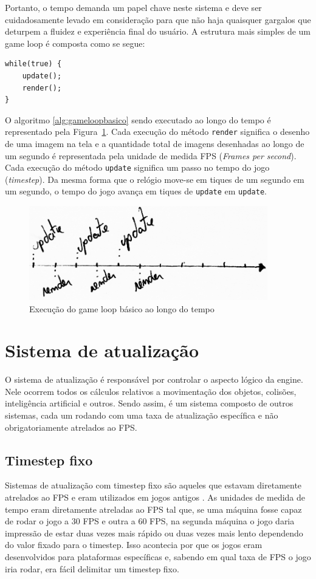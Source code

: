 \documentclass[12pt, 
openright, 
oneside, 
a4paper,    
brazil]{facom-ufu-abntex2}
\begin{document}
Portanto, o tempo demanda um papel chave neste sistema e deve ser cuidadosamente levado em consideração para que não haja quaisquer gargalos que deturpem a fluidez e experiência final do usuário. A estrutura mais simples de um game loop é composta como se segue:

\begin{lstlisting}[caption={Estrutura básica do Game Loop}, label={alg:gameloopbasico}]
while(true) {
	update();
	render();
}
\end{lstlisting}


O algoritmo \ref{alg:gameloopbasico} sendo executado ao longo do tempo é representado pela Figura~\ref{fig:gameloopbasico}.
Cada execução do método \texttt{render} significa o desenho de uma imagem na tela e a quantidade total de imagens desenhadas ao longo de um segundo é representada pela unidade de medida FPS (\textit{Frames per second}). Cada execução do método \texttt{update} significa um passo no tempo do jogo (\textit{timestep}). Da mesma forma que o relógio move-se em tiques de um segundo em um segundo, o tempo do jogo avança em tiques de \texttt{update} em \texttt{update}.

\begin{figure}[H]
	\centering
	\includegraphics[width=28em]{imagens/ilu1_small.png}
	\caption{Execução do game loop básico ao longo do tempo\label{fig:gameloopbasico}}
\end{figure}




\section{Sistema de atualização}
O sistema de atualização é responsável por controlar o aspecto lógico da engine. Nele ocorrem todos os cálculos relativos a movimentação dos objetos, colisões, inteligência artificial e outros. Sendo assim, é um sistema composto de outros sistemas, cada um rodando com uma taxa de atualização específica e não obrigatoriamente atrelados ao FPS.

\subsection{Timestep fixo}
Sistemas de atualização com timestep fixo são aqueles que estavam diretamente atrelados ao FPS e eram utilizados em jogos antigos \cite{GameEngineArchitecture}. As unidades de medida de tempo eram diretamente atreladas ao FPS tal que, se uma máquina fosse capaz de rodar o jogo a 30 FPS e outra a 60 FPS, na segunda máquina o jogo daria impressão de estar duas vezes mais rápido ou duas vezes mais lento dependendo do valor fixado para o timestep. Isso acontecia por que os jogos eram desenvolvidos para plataformas específicas e, sabendo em qual taxa de FPS o jogo iria rodar, era fácil delimitar um timestep fixo.
\end{document}
